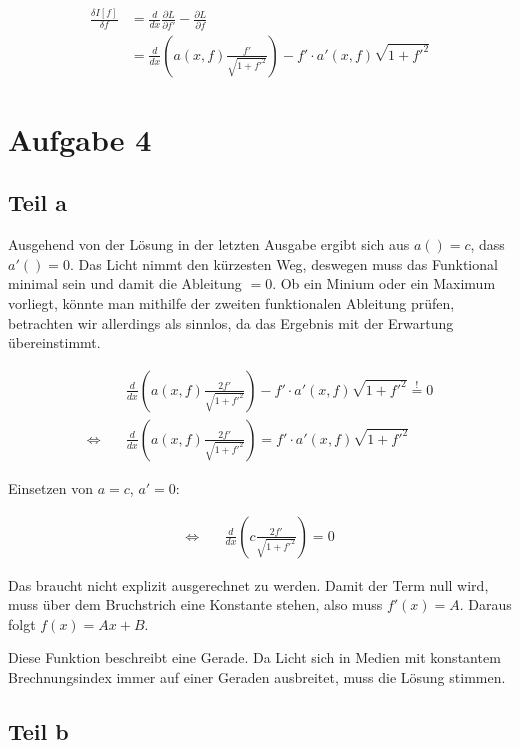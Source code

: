 \documentclass[a4paper,german,12pt,smallheadings]{scrartcl}
\begin{document}
\begin{align*}
  \frac{\delta I[f]}{\delta f} &= \frac{d}{dx} \frac{\partial L}{\partial f'} - \frac{\partial L}{\partial f} \\
  &= \frac{d}{dx} \left(a(x,f) \frac{f'}{\sqrt{1+f'^2}} \right) - f' \cdot a'(x, f) \sqrt{1+f'^2}
\end{align*}

\section*{Aufgabe 4}
\subsection*{Teil a}

Ausgehend von der Lösung in der letzten Ausgabe ergibt sich aus $a() = c$, dass
$a'() = 0$. Das Licht nimmt den kürzesten Weg, deswegen muss das Funktional
minimal sein und damit die Ableitung $=0$. Ob ein Minium oder ein Maximum
vorliegt, könnte man mithilfe der zweiten funktionalen Ableitung prüfen,
betrachten wir allerdings als sinnlos, da das Ergebnis mit der Erwartung
übereinstimmt.

\begin{align*}
  &\frac{d}{dx} \left(a(x,f) \frac{2f'}{\sqrt{1+f'^2}} \right) - f' \cdot a'(x, f) \sqrt{1+f'^2} \overset{!}{=} 0 \\
  \Leftrightarrow \quad &\frac{d}{dx} \left(a(x,f) \frac{2f'}{\sqrt{1+f'^2}} \right) = f' \cdot a'(x, f) \sqrt{1+f'^2}
\end{align*}

Einsetzen von $a = c$, $a' = 0$:

\begin{align*}
  \Leftrightarrow \quad &\frac{d}{dx} \left(c \frac{2f'}{\sqrt{1+f'^2}} \right) = 0
\end{align*}

Das braucht nicht explizit ausgerechnet zu werden. Damit der Term null wird,
muss über dem Bruchstrich eine Konstante stehen, also muss $f'(x) = A$. Daraus
folgt $f(x) = Ax+B$.

Diese Funktion beschreibt eine Gerade. Da Licht sich in Medien mit konstantem
Brechnungsindex immer auf einer Geraden ausbreitet, muss die Lösung stimmen.

\subsection*{Teil b}
\end{document}
